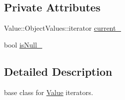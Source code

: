 \subsection*{Private Attributes}
\begin{DoxyCompactItemize}
\item 
Value\-::\-Object\-Values\-::iterator \hyperlink{classJson_1_1ValueIteratorBase_ab3138ce8af8301cca3b041ea55cb922a}{current\-\_\-}
\item 
bool \hyperlink{classJson_1_1ValueIteratorBase_a3e08b114a1aed9bde518c527f94a8c59}{is\-Null\-\_\-}
\end{DoxyCompactItemize}


\subsection{Detailed Description}
base class for \hyperlink{classJson_1_1Value}{Value} iterators. 



